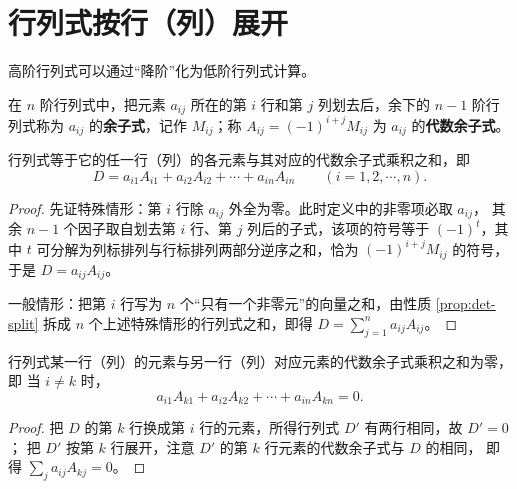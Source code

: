 \section{行列式按行（列）展开}

高阶行列式可以通过“降阶”化为低阶行列式计算。

\begin{definition}\label{def:cofactor}
在 $n$ 阶行列式中，把元素 $a_{ij}$ 所在的第 $i$ 行和第 $j$ 列划去后，余下的
$n-1$ 阶行列式称为 $a_{ij}$ 的\textbf{余子式}，记作 $M_{ij}$；称
$A_{ij}=(-1)^{i+j}M_{ij}$ 为 $a_{ij}$ 的\textbf{代数余子式}。
\end{definition}

\begin{theorem}[展开定理]\label{thm:expansion}
行列式等于它的任一行（列）的各元素与其对应的代数余子式乘积之和，即
\[
  D=a_{i1}A_{i1}+a_{i2}A_{i2}+\cdots+a_{in}A_{in}\qquad (i=1,2,\cdots,n).
\]
\end{theorem}
\begin{proof}
先证特殊情形：第 $i$ 行除 $a_{ij}$ 外全为零。此时定义中的非零项必取 $a_{ij}$，
其余 $n-1$ 个因子取自划去第 $i$ 行、第 $j$ 列后的子式，该项的符号等于
$(-1)^{t}$，其中 $t$ 可分解为列标排列与行标排列两部分逆序之和，恰为
$(-1)^{i+j}M_{ij}$ 的符号，于是 $D=a_{ij}A_{ij}$。

一般情形：把第 $i$ 行写为 $n$ 个“只有一个非零元”的向量之和，由性质
\ref{prop:det-split} 拆成 $n$ 个上述特殊情形的行列式之和，即得
$D=\sum_{j=1}^{n}a_{ij}A_{ij}$。
\end{proof}

\begin{corollary}\label{cor:alien-cofactor}
行列式某一行（列）的元素与另一行（列）对应元素的代数余子式乘积之和为零，即
当 $i\neq k$ 时，
\[
  a_{i1}A_{k1}+a_{i2}A_{k2}+\cdots+a_{in}A_{kn}=0 .
\]
\end{corollary}
\begin{proof}
把 $D$ 的第 $k$ 行换成第 $i$ 行的元素，所得行列式 $D'$ 有两行相同，故 $D'=0$；
把 $D'$ 按第 $k$ 行展开，注意 $D'$ 的第 $k$ 行元素的代数余子式与 $D$ 的相同，
即得 $\sum_{j}a_{ij}A_{kj}=0$。
\end{proof}

